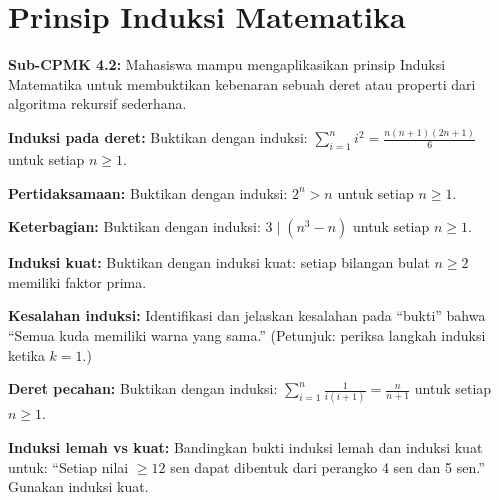 \documentclass[../main]{subfiles}
\begin{document}
\chapter{Prinsip Induksi Matematika}

\begin{subcpmk}
  \item \textbf{Sub-CPMK 4.2:} Mahasiswa mampu mengaplikasikan prinsip Induksi Matematika untuk membuktikan kebenaran sebuah deret atau properti dari algoritma rekursif sederhana.
\end{subcpmk}










\begin{aktivitas}
  \item \textbf{Induksi pada deret:} Buktikan dengan induksi: $\sum_{i=1}^{n} i^2 = \frac{n(n+1)(2n+1)}{6}$ untuk setiap $n \geq 1$.
  \item \textbf{Pertidaksamaan:} Buktikan dengan induksi: $2^n > n$ untuk setiap $n \geq 1$.
  \item \textbf{Keterbagian:} Buktikan dengan induksi: $3 \mid (n^3 - n)$ untuk setiap $n \geq 1$.
  \item \textbf{Induksi kuat:} Buktikan dengan induksi kuat: setiap bilangan bulat $n \geq 2$ memiliki faktor prima.
  \item \textbf{Kesalahan induksi:} Identifikasi dan jelaskan kesalahan pada ``bukti'' bahwa ``Semua kuda memiliki warna yang sama.'' (Petunjuk: periksa langkah induksi ketika $k = 1$.)
  \item \textbf{Deret pecahan:} Buktikan dengan induksi: $\sum_{i=1}^{n} \frac{1}{i(i+1)} = \frac{n}{n+1}$ untuk setiap $n \geq 1$.
  \item \textbf{Induksi lemah vs kuat:} Bandingkan bukti induksi lemah dan induksi kuat untuk: ``Setiap nilai $\geq 12$ sen dapat dibentuk dari perangko 4 sen dan 5 sen.'' Gunakan induksi kuat.
\end{aktivitas}

\end{document}
